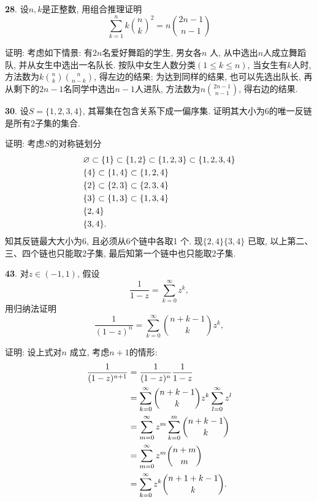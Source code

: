 \par \textbf{28}. 设$n,k$是正整数, 用组合推理证明
\begin{displaymath}
\sum_{k=1}^{n} k\binom{n}{k}^2=n\binom{2n-1}{n-1}
\end{displaymath}
\par 证明: 考虑如下情景: 有$2n$名爱好舞蹈的学生, 男女各$n$ 人, 从中选出$n$人成立舞蹈队, 并从女生中选出一名队长. 按队中女生人数分类$(1\le k\le n)$, 当女生有$k$人时, 方法数为$k\binom{n}{k}\binom{n}{n-k}$, 得左边的结果; 为达到同样的结果, 也可以先选出队长, 再从剩下的$2n-1$名同学中选出$n-1$人进队, 方法数为$n\binom{2n-1}{n-1}$, 得右边的结果.

\par \textbf{30}. 设$S=\{1,2,3,4\}$, 其幂集在包含关系下成一偏序集. 证明其大小为6的唯一反链是所有2子集的集合.
\par 证明: 考虑$S$的对称链划分
\begin{align*}
&\varnothing\subset\{1\}\subset\{1,2\}\subset\{1,2,3\}\subset\{1,2,3,4\}\notag\\
&\{4\}\subset\{1,4\}\subset\{1,2,4\}\notag\\
&\{2\}\subset\{2,3\}\subset\{2,3,4\}\notag\\
&\{3\}\subset\{1,3\}\subset\{1,3,4\}\notag\\
&\{2,4\}\notag\\
&\{3,4\}.\notag
\end{align*}
知其反链最大大小为6, 且必须从6个链中各取1 个. 现$\{2,4\}\{3,4\}$ 已取, 以上第二、三、四个链也只能取2子集,
最后知第一个链中也只能取2子集.

\par \textbf{43}. 对$z\in (-1,1)$, 假设
\begin{displaymath}
\frac{1}{1-z}=\sum_{k=0}^\infty z^k,
\end{displaymath}
用归纳法证明
\begin{displaymath}
\frac{1}{(1-z)^n}=\sum_{k=0}^\infty \binom{n+k-1}{k}z^k,
\end{displaymath}
\par 证明: 设上式对$n$ 成立, 考虑$n+1$的情形:
\begin{align*}
\frac{1}{(1-z)^{n+1}}
&=\frac{1}{(1-z)^n}\frac{1}{1-z}\notag\\
&=\sum_{k=0}^\infty \binom{n+k-1}{k}z^k \sum_{l=0}^\infty z^l\notag\\
&=\sum_{m=0}^\infty z^m \sum_{k=0}^m \binom{n+k-1}{k}\notag\\
&=\sum_{m=0}^\infty z^m \binom{n+m}{m}\notag\\
&=\sum_{k=0}^\infty z^k \binom{n+1+k-1}{k}. \notag
\end{align*}

